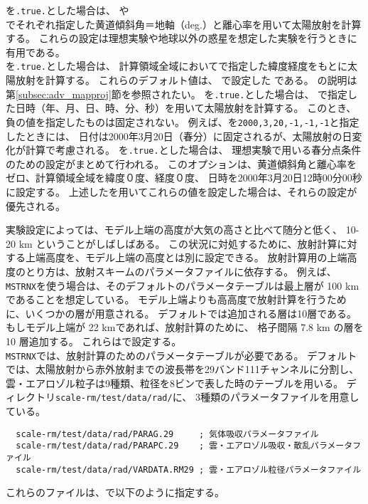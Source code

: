 を\verb|.true.|とした場合は、
や \\
でそれぞれ指定した黄道傾斜角＝地軸（deg.）と離心率を用いて太陽放射を計算する。
これらの設定は理想実験や地球以外の惑星を想定した実験を行うときに有用である。\\
%
を\verb|.true.|とした場合は、
計算領域全域においてで指定した緯度経度をもとに太陽放射を計算する。
これらのデフォルト値は、
で設定した
である。
の説明は第\ref{subsec:adv_mapproj}節を参照されたい。
%
を\verb|.true.|とした場合は、
で指定した日時（年、月、日、時、分、秒）を用いて太陽放射を計算する。
このとき、負の値を指定したものは固定されない。
例えば、を\verb|2000,3,20,-1,-1,-1|と指定したときには、
日付は2000年3月20日（春分）に固定されるが、太陽放射の日変化が計算で考慮される。
%
を\verb|.true.|とした場合は、
理想実験で用いる春分点条件のための設定がまとめて行われる。
このオプションは、黄道傾斜角と離心率をゼロ、計算領域全域を緯度０度、経度０度、
日時を2000年3月20日12時00分00秒に設定する。
上述したを用いてこれらの値を設定した場合は、それらの設定が優先される。

実験設定によっては、モデル上端の高度が大気の高さと比べて随分と低く、
10-20 km ということがしばしばある。
この状況に対処するために、放射計算に対する上端高度を、モデル上端の高度とは別に設定できる。
放射計算用の上端高度のとり方は、放射スキームのパラメータファイルに依存する。
例えば、\verb|MSTRNX|を使う場合は、そのデフォルトのパラメータテーブルは最上層が 100 km であることを想定している。
モデル上端よりも高高度で放射計算を行うために、いくつかの層が用意される。
デフォルトでは追加される層は10層である。もしモデル上端が 22 kmであれば、放射計算のために、
格子間隔 7.8 km の層を 10 層追加する。
これらはで設定する。\\

\verb|MSTRNX|では、放射計算のためのパラメータテーブルが必要である。
デフォルトでは、太陽放射から赤外放射までの波長帯を29バンド111チャンネルに分割し、
雲・エアロゾル粒子は9種類、粒径を8ビンで表した時のテーブルを用いる。
ディレクトリ\verb|scale-rm/test/data/rad/|に、
3種類のパラメータファイルを用意している。
\begin{verbatim}
  scale-rm/test/data/rad/PARAG.29     ; 気体吸収パラメータファイル
  scale-rm/test/data/rad/PARAPC.29    ; 雲・エアロゾル吸収・散乱パラメータファイル
  scale-rm/test/data/rad/VARDATA.RM29 ; 雲・エアロゾル粒径パラメータファイル
\end{verbatim}
これらのファイルは、で以下のように指定する。\\

